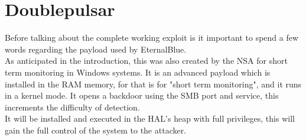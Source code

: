 \section{Doublepulsar}
Before talking about the complete working exploit is it important to spend a few words regarding the payload used by EternalBlue.\\
As anticipated in the introduction, this was also created by the NSA for short term monitoring in Windows systems.
It is an advanced payload which is installed in the RAM memory, for that is for "short term monitoring", and it runs in a kernel mode. It opens a backdoor using the SMB port and service, this increments 
the difficulty of detection.\\
It will be installed and executed in the HAL's heap with full privileges, this will gain the full control of the system to the attacker.